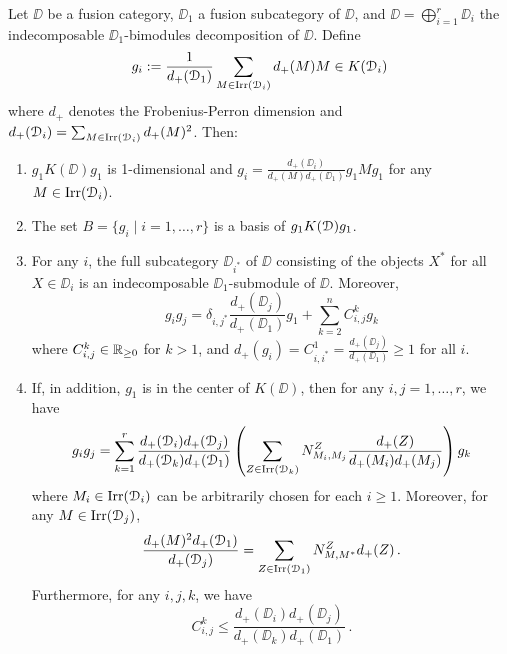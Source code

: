 \documentclass{amsart}
\begin{document}
\begin{prop}\label{p:group}
    Let $\DD$ be a fusion category, $\DD_1$  a fusion subcategory of $\DD$, and $\DD = \bigoplus_{i=1}^r \DD_i$ the indecomposable $\DD_1$-bimodules decomposition of $\DD$. Define 
\begin{equation} \label{eq:g_i}
   g_i:=\frac{1}{d_+({\EuScript{D}}_1)} \sum_{M \in \operatorname{Irr}({\EuScript{D}}_i)} d_+(M) M \in K({\EuScript{D}}_i) 
\end{equation}
where $d_+$ denotes the Frobenius-Perron dimension and $d_+({\EuScript{D}}_i)= \sum_{M \in \operatorname{Irr}({\EuScript{D}}_i)} d_+(M)^2$.
Then:
\begin{enumerate}
    \item $g_1 K(\DD) g_1$  is 1-dimensional and $g_i = \frac{d_+(\DD_i)}{d_+(M)d_+(\DD_1)}g_1 M g_1 $ for any $M \in \operatorname{Irr}({\EuScript{D}}_i)$.
    \item The set $B= \{g_i \mid i=1, \dots, r\}$ is a basis of  $g_1 {K({\EuScript{D}})} g_1$.
    \item For any $i$, the full subcategory $\DD_{i^*}$ of $\DD$ consisting of the objects $X^*$ for all $X\in \DD_i$ is an indecomposable $\DD_1$-submodule of $\DD$. Moreover,
    \begin{equation} \label{eq:prod0}
    g_i  g_j  = \delta_{i,j^*} \frac{d_+(\DD_j)}{d_+(\DD_1)} g_1 + \sum_{k =2}^n C_{i,j}^k g_k
    \end{equation}
    where $C_{i,j}^k \in {\mathbb{R}_{\ge 0}}$  for $k>1$, and $d_+(g_i) = C_{i,i^*}^1 =\frac{d_+(\DD_j)}{d_+(\DD_1)} \ge 1$ for all $i$. 
    \item If, in addition, $g_1$ is in the center of $K(\DD)$, then  for any $i,j=1, \dots, r$, we have
    \begin{equation} \label{eq:prod1}
        g_i g_j =  \sum_{k=1}^r \frac{d_+({\EuScript{D}}_i)d_+({\EuScript{D}}_j)}{d_+({\EuScript{D}}_k)d_+({\EuScript{D}}_1)}\left(\sum_{Z \in \operatorname{Irr}({\EuScript{D}}_k)}N_{M_i, M_j}^Z \frac{d_+(Z)}{d_+(M_i) d_+(M_j)}\right) g_k
    \end{equation}
    where $M_i \in \operatorname{Irr}({\EuScript{D}}_i)$ can be arbitrarily chosen for each $i \ge 1$.  Moreover, 
    for any $M \in \operatorname{Irr}({\EuScript{D}}_j)$, 
    \begin{equation} \label{eq:prod2}
    \frac{d_+(M)^2 d_+({\EuScript{D}}_1)}{d_+({\EuScript{D}}_j)} = \sum_{Z \in \operatorname{Irr}({\EuScript{D}}_1)} N_{M,M^*}^Z d_+(Z)\,.
  \end{equation}
Furthermore, for any $i,j,k$, we have
\begin{equation} \label{eq:ineq1}
    C_{i,j}^k \le \frac{d_+(\DD_i)d_+(\DD_j)}{d_+(\DD_k) d_+(\DD_1)}\,. 
\end{equation}
\end{enumerate}
\end{prop}
\end{document}
